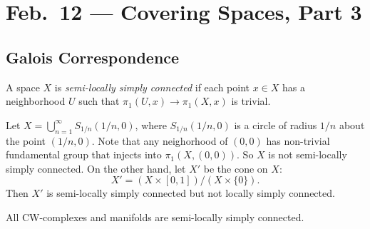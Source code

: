 \chapter{Feb.~12 --- Covering Spaces, Part 3}

\section{Galois Correspondence}

\begin{definition}
  A space $X$ is \emph{semi-locally simply connected} if
  each point $x \in X$ has a neighborhood $U$ such that
  $\pi_1(U, x) \to \pi_1(X, x)$ is trivial.
\end{definition}

\begin{example}
  Let $X = \bigcup_{n = 1}^\infty S_{1 / n}(1 / n, 0)$,
  where $S_{1 / n}(1 / n, 0)$ is a circle of radius $1 / n$
  about the point $(1 / n, 0)$. Note that any
  neighorhood of $(0, 0)$ has non-trivial fundamental group
  that injects into $\pi_1(X, (0, 0))$.
  So $X$ is not semi-locally simply connected. On the other
  hand,
  let $X'$ be the cone on $X$:
  \[
    X' = (X \times [0, 1]) / (X \times \{0\}).
  \]
  Then $X'$ is semi-locally simply connected but not
  locally simply connected.
\end{example}

\begin{remark}
  All CW-complexes and manifolds are semi-locally
  simply connected.
\end{remark}

